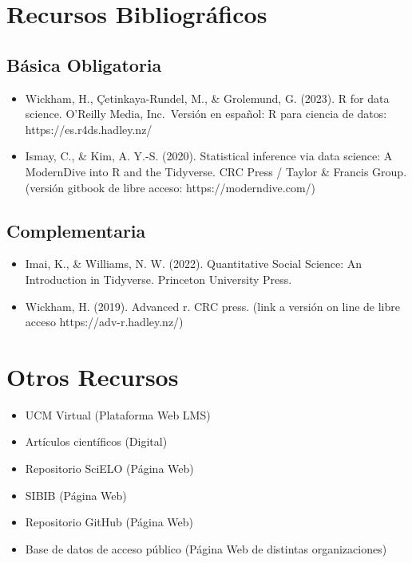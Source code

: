\documentclass[11pt,letter,]{article}
\providecommand{\tightlist}{%
  \setlength{\itemsep}{0pt}\setlength{\parskip}{0pt}}
\begin{document}
\hypertarget{recursos-bibliogruxe1ficos}{%
\section{Recursos Bibliográficos}\label{recursos-bibliogruxe1ficos}}

\hypertarget{buxe1sica-obligatoria}{%
\subsection{Básica Obligatoria}\label{buxe1sica-obligatoria}}

\begin{itemize}
\tightlist
\item
  Wickham, H., Çetinkaya-Rundel, M., \& Grolemund, G. (2023). R for data
  science. O'Reilly Media, Inc.~Versión en español: R para ciencia de
  datos: https://es.r4ds.hadley.nz/
\item
  Ismay, C., \& Kim, A. Y.-S. (2020). Statistical inference via data
  science: A ModernDive into R and the Tidyverse. CRC Press / Taylor \&
  Francis Group. (versión gitbook de libre acceso:
  https://moderndive.com/)
\end{itemize}

\hypertarget{complementaria}{%
\subsection{Complementaria}\label{complementaria}}

\begin{itemize}
\tightlist
\item
  Imai, K., \& Williams, N. W. (2022). Quantitative Social Science: An
  Introduction in Tidyverse. Princeton University Press.
\item
  Wickham, H. (2019). Advanced r. CRC press. (link a versión on line de
  libre acceso https://adv-r.hadley.nz/)
\end{itemize}

\hypertarget{otros-recursos}{%
\section{Otros Recursos}\label{otros-recursos}}

\begin{itemize}
\tightlist
\item
  UCM Virtual (Plataforma Web LMS)
\item
  Artículos científicos (Digital)
\item
  Repositorio SciELO (Página Web)
\item
  SIBIB (Página Web)
\item
  Repositorio GitHub (Página Web)
\item
  Base de datos de acceso público (Página Web de distintas
  organizaciones)
\end{itemize}
\end{document}
